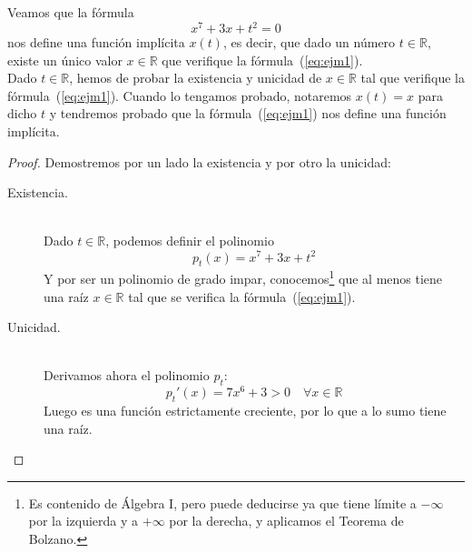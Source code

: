 \begin{ejemplo}
    Veamos que la fórmula
    \begin{equation}\label{eq:ejm1}
        x^7+3x+t^2 = 0
    \end{equation}
    nos define una función implícita $x(t)$, es decir, que dado un número $t\in \mathbb{R}$, existe un único valor $x\in \mathbb{R}$ que verifique la fórmula~(\ref{eq:ejm1}).\\

    Dado $t\in \mathbb{R}$, hemos de probar la existencia y unicidad de $x\in \mathbb{R}$ tal que verifique la fórmula~(\ref{eq:ejm1}). Cuando lo tengamos probado, notaremos $x(t) = x$ para dicho $t$ y tendremos probado que la fórmula~(\ref{eq:ejm1}) nos define una función implícita.
    \begin{proof} Demostremos por un lado la existencia y por otro la unicidad:
        \begin{description}
            \item [Existencia.]~\\
                Dado $t\in \mathbb{R}$, podemos definir el polinomio
                \begin{equation*}
                    p_t(x) = x^7+3x+t^2
                \end{equation*}
                Y por ser un polinomio de grado impar, conocemos\footnote{Es contenido de Álgebra I, pero puede deducirse ya que tiene límite a $-\infty$ por la izquierda y a $+\infty$ por la derecha, y aplicamos el Teorema de Bolzano.} que al menos tiene una raíz $x\in \mathbb{R}$ tal que se verifica la fórmula~(\ref{eq:ejm1}).\\
            \item [Unicidad.]~\\
                Derivamos ahora el polinomio $p_t$:
                \begin{equation*}
                    p_t'(x) = 7x^6+3 > 0 \quad \forall x\in \mathbb{R}
                \end{equation*}
                Luego es una función estrictamente creciente, por lo que a lo sumo tiene una raíz.
        \end{description}
    \end{proof}
\end{ejemplo}

